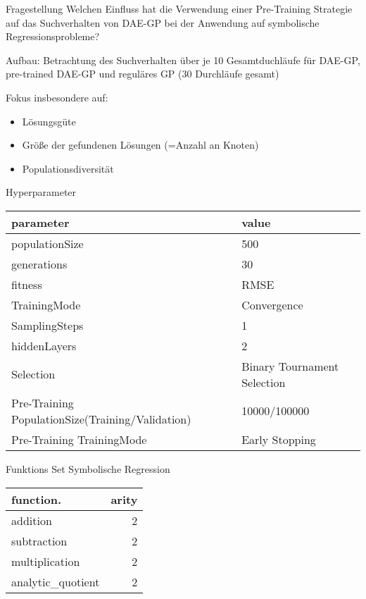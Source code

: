 \documentclass[
  ignorenonframetext,
]{beamer}
\providecommand{\tightlist}{%
  \setlength{\itemsep}{0pt}\setlength{\parskip}{0pt}}
\begin{document}
\begin{frame}{Fragestellung}
\protect\hypertarget{fragestellung-1}{}
Welchen Einfluss hat die Verwendung einer Pre-Training Strategie auf das
Suchverhalten von DAE-GP bei der Anwendung auf symbolische
Regressionsprobleme?

Aufbau: Betrachtung des Suchverhalten über je 10 Gesamtduchläufe für
DAE-GP, pre-trained DAE-GP und reguläres GP (\(30\) Durchläufe gesamt)

Fokus insbesondere auf:

\begin{itemize}
\tightlist
\item
  Lösungsgüte
\item
  Größe der gefundenen Lösungen (=Anzahl an Knoten)
\item
  Populationsdiversität
\end{itemize}
\end{frame}

\begin{frame}{Hyperparameter}
\protect\hypertarget{hyperparameter}{}
\begin{table}[!h]
\centering
\begin{tabular}{l|l}
\hline
\textbf{parameter} & \textbf{value}\\
\hline
populationSize & 500\\
\hline
generations & 30\\
\hline
fitness & RMSE\\
\hline
TrainingMode & Convergence\\
\hline
SamplingSteps & 1\\
\hline
hiddenLayers & 2\\
\hline
Selection & Binary Tournament Selection\\
\hline
Pre-Training PopulationSize(Training/Validation) & 10000/100000\\
\hline
Pre-Training TrainingMode & Early Stopping\\
\hline
\end{tabular}
\end{table}
\end{frame}

\begin{frame}{Funktions Set Symbolische Regression}
\protect\hypertarget{funktions-set-symbolische-regression}{}
\begin{table}[!h]
\centering
\begin{tabular}{l|r}
\hline
\textbf{function.} & \textbf{arity}\\
\hline
addition & 2\\
\hline
subtraction & 2\\
\hline
multiplication & 2\\
\hline
analytic\_quotient & 2\\
\hline
\end{tabular}
\end{table}
\end{frame}
\end{document}

